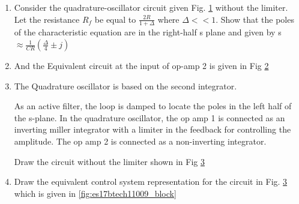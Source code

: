 \begin{enumerate}[label=\thesubsection.\arabic*.,ref=\thesubsection.\theenumi]
\item
Consider the quadrature-oscillator circuit given Fig. \ref{fig:es17btech11009_fig1} without the limiter. Let the resistance $R_{f}$ be equal to $\frac{2R}{1 + \Delta}$ where $\Delta << 1$. Show that the poles of the characteristic equation are in the right-half s plane and given by 
s $\approx \frac{1}{CR}(\frac{\Delta}{4}\pm j)$
\renewcommand{\thefigure}{\theenumi.\arabic{figure}}
\begin{figure}[!ht]
	\begin{center}
		\resizebox{\columnwidth}{!}{}
	\end{center}
\caption{}
\label{fig:es17btech11009_fig1}
\end{figure}
\item
And the Equivalent circuit at the input of op-amp 2 is given in Fig \ref{fig:es17btech11009_fig2}
\renewcommand{\thefigure}{\theenumi.\arabic{figure}}
\begin{figure}[!ht]
	\begin{center}
		\resizebox{\columnwidth}{!}{}
	\end{center}
\caption{}
\label{fig:es17btech11009_fig2}
\end{figure}

\item 
\solution The Quadrature oscillator is based on the second integrator.

As an active filter, the loop is damped to locate the poles in the left half of the s-plane. In the quadrature oscillator, the op amp 1 is connected as an inverting miller integrator with a limiter in the feedback for controlling the amplitude. The op amp 2 is connected as a non-inverting integrator.

Draw the circuit without the limiter shown in Fig \ref{fig:es17btech11009_fig3}
\renewcommand{\thefigure}{\theenumi.\arabic{figure}}
\begin{figure}[!ht]
	\begin{center}
		\resizebox{\columnwidth}{!}{}
	\end{center}
\caption{}
\label{fig:es17btech11009_fig3}
\end{figure}
\item
Draw the equivalent control system representation for the circuit in Fig. \ref{fig:es17btech11009_fig3} which is given in \ref{fig:es17btech11009_block}


\end{enumerate}
